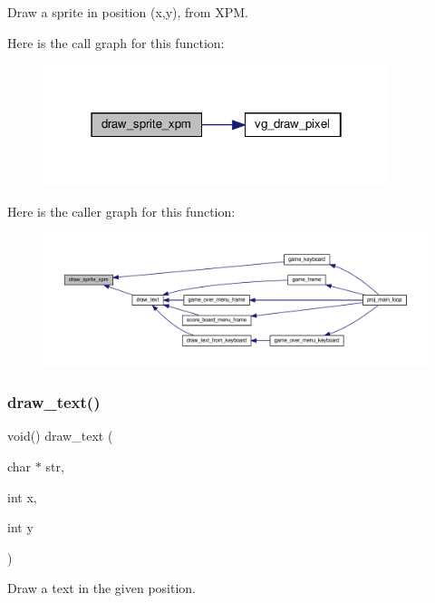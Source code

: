 Draw a sprite in position (x,y), from X\+PM. 

Here is the call graph for this function\+:
\nopagebreak
\begin{figure}[H]
\begin{center}
\leavevmode
\includegraphics[width=286pt]{group__graphics_gaf7d28831f1ffad3816101e473a54b9be_cgraph}
\end{center}
\end{figure}
Here is the caller graph for this function\+:
\nopagebreak
\begin{figure}[H]
\begin{center}
\leavevmode
\includegraphics[width=350pt]{group__graphics_gaf7d28831f1ffad3816101e473a54b9be_icgraph}
\end{center}
\end{figure}
\mbox{\label{group__graphics_ga37cbb1079da920cd529418d4a9f83ff2}} 
\subsubsection{\texorpdfstring{draw\+\_\+text()}{draw\_text()}}
{\footnotesize\ttfamily void() draw\+\_\+text (\begin{DoxyParamCaption}\item[{char $\ast$}]{str,  }\item[{int}]{x,  }\item[{int}]{y }\end{DoxyParamCaption})}



Draw a text in the given position. 

